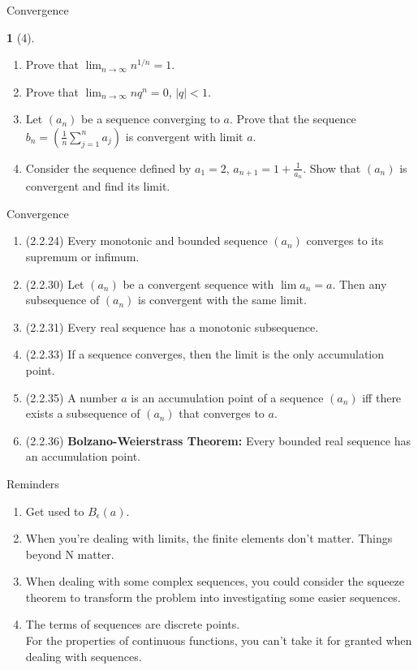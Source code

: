 \documentclass[dvipsnames]{beamer}
\theoremstyle{plain}
\theoremstyle{definition}
\newtheorem{exercise}[theorem]{\translate{Exercise}}
\begin{document}
\begin{frame}{Convergence}
\begin{exercise}[4]
\begin{enumerate}
    \item Prove that \(\displaystyle \lim_{n \to \infty} n^{1/n} = 1\).
    \item Prove that \(\displaystyle \lim_{n \to \infty} nq^{n} = 0\), $|q| < 1$.
    \item Let \((a_n)\) be a sequence converging to \(a\). Prove that the sequence
    \(b_n = \displaystyle \left(\frac{1}{n}\sum_{j=1}^{n} a_j\right)\) is convergent with limit \(a\).
    \item Consider the sequence defined by \(a_1 = 2\), \(a_{n+1} = 1 + \frac{1}{a_n}\). Show that \((a_n)\) is convergent and find its limit.
\end{enumerate}
\end{exercise}
\end{frame}
\begin{frame}{Convergence}

\begin{enumerate}
    \item (2.2.24) Every monotonic and bounded sequence \((a_n)\) converges to its supremum or infimum.
    \item (2.2.30) Let \((a_n)\) be a convergent sequence with \(\lim a_n = a\). Then any subsequence of \((a_n)\) is convergent with the same limit.
    \item (2.2.31) Every real sequence has a monotonic subsequence.
    \item (2.2.33) If a sequence converges, then the limit is the only accumulation point.
    \item (2.2.35) A number \(a\) is an accumulation point of a sequence \((a_n)\) iff there exists a subsequence of \((a_n)\) that converges to \(a\).
    \item (2.2.36) \textbf{Bolzano-Weierstrass Theorem:} Every bounded real sequence has an accumulation point.
\end{enumerate}

\end{frame}

\begin{frame}{Reminders}
\begin{enumerate}
  \item Get used to $B_\epsilon(a)$.
  \item When you're dealing with limits, the finite elements don't matter. Things beyond N matter.
  \item When dealing with some complex sequences, you could consider the squeeze theorem to transform the problem into investigating some easier sequences.
  \item The terms of sequences are discrete points. \\ For the properties of continuous functions, you can't take it for granted when dealing with sequences.
\end{enumerate}
\end{frame}
\end{document}
